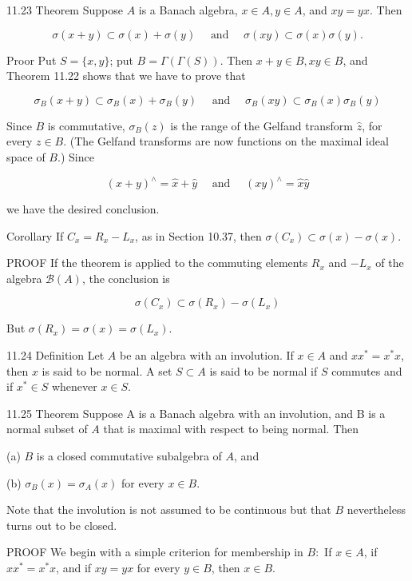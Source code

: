 \documentclass[10pt]{article}
\begin{document}
11.23 Theorem Suppose $A$ is a Banach algebra, $x \in A, y \in A$, and $x y=y x$. Then

$$
\sigma(x+y) \subset \sigma(x)+\sigma(y) \quad \text { and } \quad \sigma(x y) \subset \sigma(x) \sigma(y) .
$$

Proor Put $S=\{x, y\}$; put $B=\Gamma(\Gamma(S))$. Then $x+y \in B, x y \in B$, and Theorem 11.22 shows that we have to prove that

$$
\sigma_{B}(x+y) \subset \sigma_{B}(x)+\sigma_{B}(y) \quad \text { and } \quad \sigma_{B}(x y) \subset \sigma_{B}(x) \sigma_{B}(y)
$$

Since $B$ is commutative, $\sigma_{B}(z)$ is the range of the Gelfand transform $\hat{z}$, for every $z \in B$. (The Gelfand transforms are now functions on the maximal ideal space of $B$.) Since

$$
(x+y)^{\wedge}=\hat{x}+\hat{y} \quad \text { and } \quad(x y)^{\wedge}=\hat{x} \hat{y}
$$

we have the desired conclusion.

Corollary If $C_{x}=R_{x}-L_{x}$, as in Section 10.37, then $\sigma\left(C_{x}\right) \subset \sigma(x)-\sigma(x)$.

PROOF If the theorem is applied to the commuting elements $R_{x}$ and $-L_{x}$ of the algebra $\mathscr{B}(A)$, the conclusion is

$$
\sigma\left(C_{x}\right) \subset \sigma\left(R_{x}\right)-\sigma\left(L_{x}\right)
$$

But $\sigma\left(R_{x}\right)=\sigma(x)=\sigma\left(L_{x}\right)$.

11.24 Definition Let $A$ be an algebra with an involution. If $x \in A$ and $x x^{*}=x^{*} x$, then $x$ is said to be normal. A set $S \subset A$ is said to be normal if $S$ commutes and if $x^{*} \in S$ whenever $x \in S$.

11.25 Theorem Suppose A is a Banach algebra with an involution, and B is a normal subset of $A$ that is maximal with respect to being normal. Then

(a) $B$ is a closed commutative subalgebra of $A$, and

(b) $\sigma_{B}(x)=\sigma_{A}(x)$ for every $x \in B$.

Note that the involution is not assumed to be continuous but that $B$ nevertheless turns out to be closed.

PROOF We begin with a simple criterion for membership in $B:$ If $x \in A$, if $x x^{*}=x^{*} x$, and if $x y=y x$ for every $y \in B$, then $x \in B$.
\end{document}
